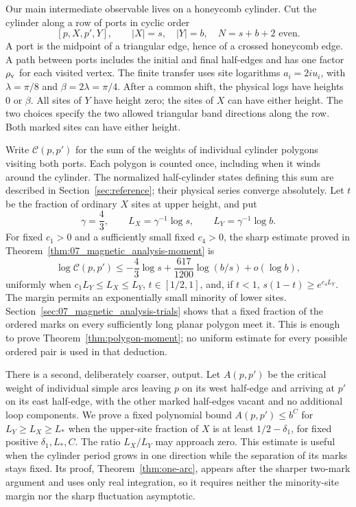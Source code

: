 Our main intermediate observable lives on a honeycomb cylinder. Cut the
cylinder along a row of ports in cyclic order
\[
 [p,X,p',Y],\qquad |X|=s,\quad |Y|=b,\quad N=s+b+2\text{ even}.
\]
A port is the midpoint of a triangular edge, hence of a crossed
honeycomb edge. A path between ports includes the initial and final
half-edges and has one factor $\rho_{\rm v}$ for each visited vertex.
The finite transfer uses site logarithms $a_i=2iu_i$, with
$\lambda=\pi/8$ and $\beta=2\lambda=\pi/4$. After a common shift,
the physical logs have heights $0$ or $\beta$. All sites of $Y$ have
height zero; the sites of $X$ can have either height. The two choices
specify the two allowed triangular band directions along the row.
Both marked sites can have either height.

Write $\mathcal C(p,p')$ for the sum of the weights of individual
cylinder polygons visiting both ports. Each polygon is counted once,
including when it winds around the cylinder. The normalized
half-cylinder states defining this sum are described in
Section~\ref{sec:reference}; their physical series converge absolutely.
Let $t$ be the fraction of ordinary $X$ sites at upper height, and put
\[
 \gamma=\frac43,\qquad L_X=\gamma^{-1}\log s,
 \qquad L_Y=\gamma^{-1}\log b.
\]
For fixed $c_1>0$ and a sufficiently small fixed $c_4>0$, the sharp
estimate proved in Theorem~\ref{thm:07_magnetic_analysis-moment} is
\[
 \log\mathcal C(p,p')\le -\frac43\log s
       +\frac{617}{1200}\log(b/s)+o(\log b),
\]
uniformly when $c_1L_Y\le L_X\le L_Y$, $t\in[1/2,1]$, and,
if $t<1$, $s(1-t)\ge e^{c_4L_Y}$. The margin permits an exponentially
small minority of lower sites. Section~\ref{sec:07_magnetic_analysis-trials}
shows that a fixed fraction of the ordered marks on every sufficiently
long planar polygon meet it. This is enough to prove
Theorem~\ref{thm:polygon-moment}; no uniform estimate for every possible
ordered pair is used in that deduction.

There is a second, deliberately coarser, output. Let $A(p,p')$ be the
critical weight of individual simple arcs leaving $p$ on its west
half-edge and arriving at $p'$ on its east half-edge, with the
other marked half-edges vacant and no additional loop components. We prove a fixed
polynomial bound $A(p,p')\le b^C$ for
$L_Y\ge L_X\ge L_*$ when the upper-site fraction of $X$ is at least
$1/2-\delta_1$, for fixed positive $\delta_1,L_*,C$. The ratio
$L_X/L_Y$ may approach zero. This estimate is useful when the cylinder
period grows in one direction while the separation of its marks stays
fixed. Its proof, Theorem~\ref{thm:one-arc}, appears after the sharper two-mark argument and uses
only real integration, so it requires neither the minority-site margin
nor the sharp fluctuation asymptotic.


